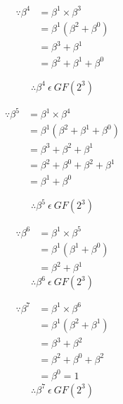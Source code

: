 \documentclass[paper=usletter, fontsize=12pt]{article}
\begin{document}
            \begin{equation*}
                \begin{split}
                    \because \beta^{4} & = \beta^{1} \times \beta^{3} \\
                    & = \beta^{1} (\beta^{2}+\beta^{0}) \\
                    & = \beta^{3}+\beta^{1} \\
                    & = \beta^{2}+\beta^{1}+\beta^{0}
                \end{split}
            \end{equation*}

            \[ \therefore \beta^{4} \ \epsilon \ GF(2^{3}) \]

            \begin{equation*}
                \begin{split}
                    \because \beta^{5} & = \beta^{1} \times \beta^{4} \\
                    & = \beta^{1} (\beta^{2}+\beta^{1}+\beta^{0}) \\
                    & = \beta^{3}+\beta^{2}+\beta^{1} \\
                    & = \beta^{2}+\beta^{0}+\beta^{2}+\beta^{1} \\
                    & = \beta^{1}+\beta^{0}
                \end{split}
            \end{equation*}

            \[ \therefore \beta^{5} \ \epsilon \ GF(2^{3}) \]

            \begin{equation*}
                \begin{split}
                    \because \beta^{6} & = \beta^{1} \times \beta^{5} \\
                    & = \beta^{1} (\beta^{1}+\beta^{0}) \\
                    & = \beta^{2}+\beta^{1}
                \end{split}
            \end{equation*}
            \[ \therefore \beta^{6} \ \epsilon \ GF(2^{3}) \]

            \begin{equation*}
                \begin{split}
                    \because \beta^{7} & = \beta^{1} \times \beta^{6} \\
                    & = \beta^{1} (\beta^{2}+\beta^{1}) \\
                    & = \beta^{3}+\beta^{2} \\
                    & = \beta^{2}+\beta^{0}+\beta^{2} \\
                    & = \beta^{0} = 1
                \end{split}
            \end{equation*}
            \[ \therefore \beta^{7} \ \epsilon \ GF(2^{3}) \]
\end{document}
